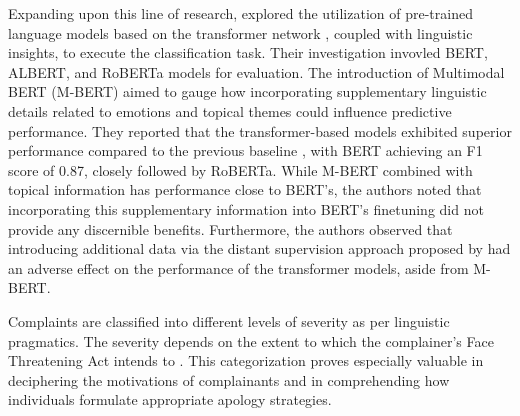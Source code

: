 Expanding upon this line of research, \cite{jin_complaint_2020} explored the utilization of pre-trained language models based on the transformer network \cite{vaswaniAttentionAllYou2023a}, coupled with linguistic insights, to execute the classification task. Their investigation invovled BERT, ALBERT, and RoBERTa models for evaluation. The introduction of Multimodal BERT (M-BERT) aimed to gauge how incorporating supplementary linguistic details related to emotions and topical themes could influence predictive performance. They reported that the transformer-based models exhibited superior performance compared to the previous baseline \cite{preotiuc-pietro_automatically_2019}, with BERT achieving an F1 score of 0.87, closely followed by RoBERTa. While M-BERT combined with topical information has performance close to BERT's, the authors noted that incorporating this supplementary information into BERT's finetuning did not provide any discernible benefits. Furthermore, the authors observed that introducing additional data via the distant supervision approach proposed by \cite{preotiuc-pietro_automatically_2019} had an adverse effect on the performance of the transformer models, aside from M-BERT.

Complaints are classified into different levels of severity as per linguistic pragmatics. The severity depends on the extent to which the complainer's Face Threatening Act intends to . This categorization proves especially valuable in deciphering the motivations of complainants and in comprehending how individuals formulate appropriate apology strategies.